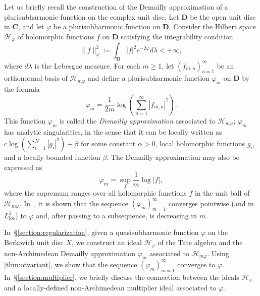 \documentclass[10pt,reqno]{amsart}
\theoremstyle{plain}
\theoremstyle{definition}
\renewcommand{\H}{\mathcal{H}}
\numberwithin{equation}{section}
\begin{document}
Let us briefly recall the construction of the Demailly approximation of a plurisubharmonic function on the complex unit disc. Let $\mathbf{D}$ be the open unit disc in $\mathbf{C}$, and let $\varphi$ be a plurisubharmonic function on $\mathbf{D}$. Consider the Hilbert space $\mathscr{H}_{\varphi}$ of holomorphic functions $f$ on $\mathbf{D}$ satisfying the integrability condition
$$
\| f \|_{\varphi}^2 \coloneqq \int_{\mathbf{D}} |f|^2 e^{-2\varphi} d\lambda < +\infty,
$$
where $d\lambda$ is the Lebesgue measure. For each $m \geq 1$, let $(f_{m, n})_{n=1}^{\infty}$ be an orthonormal basis of $\mathscr{H}_{m\varphi}$ and define a plurisubharmonic function $\varphi_m$ on $\mathbf{D}$ by the formula 
$$
\varphi_m = \frac{1}{2m} \log\left( \sum_{n=1}^{\infty} |f_{m,n}|^2 \right).
$$
This function $\varphi_m$ is called the \emph{Demailly approximation} associated to $\mathscr{H}_{m\varphi}$; $\varphi_m$ has analytic singularities, 
in the sense that it can be locally written as $c \log \left( \sum_{i=1}^N |g_i |^2 \right) + \beta$ for some constant $\alpha > 0$,  local holomorphic functions $g_i$, and a locally bounded function $\beta$. The Demailly approximation may also be expressed as 
$$
\varphi_m = \sup_f \frac{1}{m} \log |f|,
$$
where the supremum ranges over all holomorphic functions $f$ in the unit ball of $\mathscr{H}_{m\varphi}$. In~\cite[Proposition 3.1]{demailly92}, it is shown that the sequence $(\varphi_m)_{m =1}^{\infty}$ converges pointwise (and in $L^1_{\textrm{loc}}$) to $\varphi$ and, after passing to a subsequence, is decreasing in $m$.

In~\S\ref{section:regularization}, given a quasisubharmonic function $\varphi$ on the Berkovich unit disc $X$, we construct an ideal $\H_{\varphi}$ of the Tate algebra and the non-Archimedean Demailly approximation $\varphi_m$ associated to $\H_{m\varphi}$. Using \cref{thm:otvariant}, we show that the sequence $(\varphi_m)_{m=1}^{\infty}$  converges to $\varphi$. In~\S\ref{section:multiplier}, we briefly discuss the connection between the ideals $\H_{\varphi}$ and a locally-defined non-Archimedean multiplier ideal associated to $\varphi$.
\end{document}
